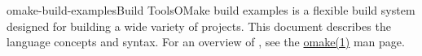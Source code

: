 %
%
%
\begin{Name}{1}{omake-build-examples}{\authors}{Build Tools}{OMake build examples}
   is a flexible build system designed for building a wide variety of projects.
  This document describes the language concepts and syntax.
  For an overview of , see the \href{omake.html}{omake(1)} man page.
\end{Name}

